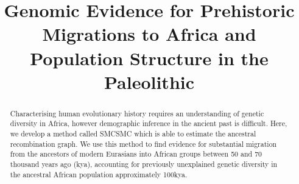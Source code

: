 \documentclass{article}
\title{Genomic Evidence for Prehistoric Migrations to Africa and Population Structure in the Paleolithic}
\author{}
\date{}
\begin{document}
\maketitle

\begin{abstract}
	Characterising human evolutionary history requires an understanding of genetic diversity in Africa, however demographic inference in the ancient past is difficult. Here, we develop a method called SMCSMC which is able to estimate the ancestral recombination graph. We use this method to find evidence for substantial migration from the ancestors of modern Eurasians into African groups between 50 and 70 thousand years ago (kya), accounting for previously unexplained genetic diversity in the ancestral African population approximately 100kya.

\end{abstract}
\end{document}
